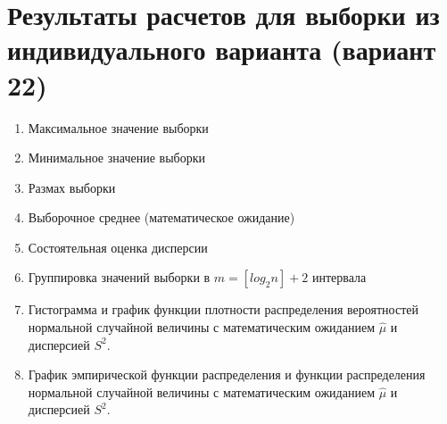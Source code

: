 \documentclass[a4paper,oneside,12pt]{extreport}
\theoremstyle{indented}
\begin{document}
\section{Результаты расчетов для выборки из индивидуального варианта (вариант 22)} 

\begin{enumerate}
\item Максимальное значение выборки
\item Минимальное значение выборки
\item Размах выборки
\item Выборочное среднее (математическое ожидание)
\item Состоятельная оценка дисперсии
\item Группировка значений выборки в $m = [log_2 n] + 2$ интервала


\item Гистограмма и график функции плотности распределения вероятностей нормальной случайной величины с математическим ожиданием $\hat \mu$ и дисперсией $S^2$. 


\newpage

\item График эмпирической функции распределения и функции распределения нормальной случайной величины с математическим ожиданием $\hat \mu$ и дисперсией $S^2$. 


\end{enumerate}
\end{document}
